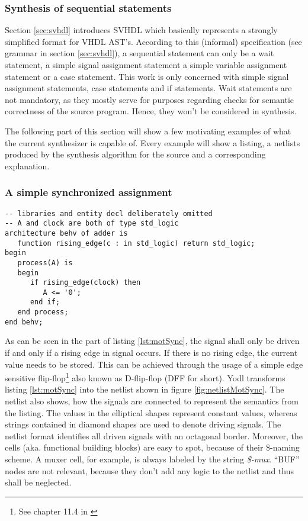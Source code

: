 \subsubsection{Synthesis of sequential statements}
Section \ref{sec:svhdl} introduces SVHDL which basically represents a
strongly simplified format for VHDL AST's. According to this
(informal) specification (see grammar in section \ref{sec:svhdl}), a
sequential statement can only be a wait statement, a simple signal
assignment statement a simple variable assignment statement or a case
statement. This work is only concerned with simple signal assignment
statements, case statements and if statements. Wait statements are not
mandatory, as they mostly serve for purposes regarding checks for
semantic correctness of the source program. Hence, they won't be
considered in synthesis.

The following part of this section will show a few motivating examples
of what the current synthesizer is capable of. Every example will
show a listing, a netlists produced by the synthesis
algorithm for the source and a corresponding explanation.

\subsubsection{A simple synchronized assignment}
\leavevmode\begin{lstlisting}[style=vhdl, caption={Code for a synchronized bit
      assignment}, label={lst:motSync}]
-- libraries and entity decl deliberately omitted
-- A and clock are both of type std_logic
architecture behv of adder is
   function rising_edge(c : in std_logic) return std_logic;
begin
   process(A) is
   begin
      if rising_edge(clock) then
         A <= '0';
      end if;
   end process;
end behv;
\end{lstlisting}
%
As can be seen in the  part of listing \ref{lst:motSync},
the signal  shall only be driven if and only if a rising edge in
signal  occurs. If there is no rising edge, the current
value needs to be stored. This can be achieved through the usage of a
simple edge sensitive flip-flop\footnote{See chapter 11.4 in
  \cite{DIGITALTECHNIK}} also known as D-flip-flop (DFF for
short). Yodl transforms listing \ref{lst:motSync} into the netlist
shown in figure \ref{fig:netlistMotSync}. The netlist also shows, how
the signals are connected to represent the semantics from the
listing.
The values in the elliptical shapes represent constant values, whereas
strings contained in diamond shapes are used to denote driving
signals. The netlist format identifies all driven signals with an
octagonal border. Moreover, the cells (aka. functional building
blocks) are easy to spot, because of their \$-naming scheme. A muxer
cell, for example, is always labeled by the string \emph{\$-mux}. ``BUF''
nodes are not
relevant, because they don't add any logic to the netlist and thus
shall be neglected.

